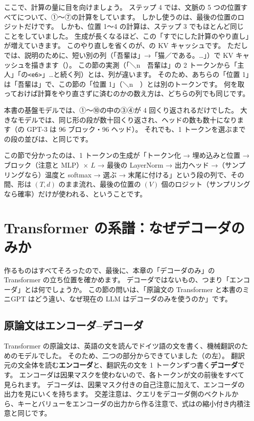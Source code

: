 ここで、計算の量に目を向けましょう。
ステップ 4 では、文脈の 5 つの位置すべてについて、①〜⑦の計算をしています。
しかし使うのは、最後の位置のロジットだけです。
しかも、位置 1〜4 の計算は、ステップ 3 でもほとんど同じことをしていました。
生成が長くなるほど、この「すでにした計算のやり直し」が増えていきます。
このやり直しを省くのが、の KV キャッシュです。
ただしでは、説明のために、短い別の列（「吾輩は」→「猫／である。…」）で KV キャッシュを描きます（）。
この節の実測（「＼n　吾輩は」の 2 トークンから「主人」「の\texttt{<e6>}」…と続く列）とは、列が違います。
そのため、あちらの「位置 1」は「吾輩は」で、この節の「位置 1」（＼n　）とは別のトークンです。
何を取っておけば計算をやり直さずに済むのかの数え方は、どちらの列でも同じです。

本書の基盤モデルでは、①〜⑩の中の③④が 4 回くり返されるだけでした。
大きなモデルでは、同じ形の段が数十回くり返され、ヘッドの数も数十になります（の GPT-3 は 96 ブロック・96 ヘッド）。
それでも、1 トークンを選ぶまでの段の並びは、と同じです。

この節で分かったのは、1 トークンの生成が「トークン化 → 埋め込みと位置 → ブロック（注意と MLP）× $L$ → 最後の LayerNorm → 出力ヘッド →（サンプリングなら）温度と softmax → 選ぶ → 末尾に付ける」という段の列で、その間、形は $(T,d)$ のまま流れ、最後の位置の $(V)$ 個のロジット（サンプリングなら確率）だけが使われる、ということです。

\section{Transformer の系譜：なぜデコーダのみか}\label{sec:tf-family}

作るものはすべてそろったので、最後に、本章の「デコーダのみ」の Transformer の立ち位置を確かめます。
デコーダではないもの、つまり「エンコーダ」とは何でしょうか。
この節の問いは、「原論文の Transformer と本書のミニGPT はどう違い、なぜ現在の LLM はデコーダのみを使うのか」です。

\subsection*{原論文はエンコーダ–デコーダ}

Transformer の原論文\cite{vaswani2017attention}は、英語の文を読んでドイツ語の文を書く、機械翻訳のためのモデルでした。
そのため、二つの部分からできていました（の左）。
翻訳元の文全体を読む\textbf{エンコーダ}と、翻訳先の文を 1 トークンずつ書く\textbf{デコーダ}です。
エンコーダは因果マスクを使わないので、各トークンが文の前後をすべて見られます。
デコーダは、因果マスク付きの自己注意に加えて、エンコーダの出力を見にいくを持ちます。
交差注意は、クエリをデコーダ側のベクトルから、キーとバリューをエンコーダの出力から作る注意で、式はの縮小付き内積注意と同じです。

